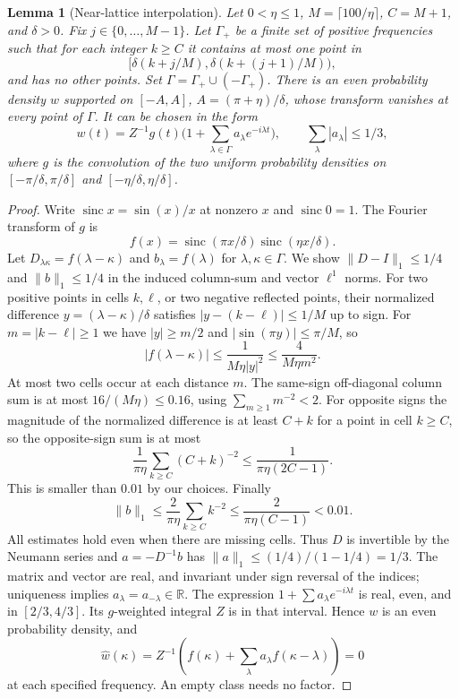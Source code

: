 \documentclass[11pt]{article}
\newtheorem{lemma}[theorem]{Lemma}
\theoremstyle{definition}\newtheorem{definition}[theorem]{Definition}
\newcommand{\R}{\mathbb R}\newcommand{\C}{\mathbb C}\newcommand{\F}{\mathcal F}\newcommand{\sinc}{\operatorname{sinc}}\newcommand{\arcosh}{\operatorname{arcosh}}\newcommand{\sech}{\operatorname{sech}}\newcommand{\ord}{\operatorname{ord}}\newcommand{\supp}{\operatorname{supp}}\newcommand{\dd}{\,\mathrm d}\newcommand{\vnorm}[1]{\lVert #1\rVert}
\begin{document}
\begin{lemma}[Near-lattice interpolation]\label{lem:phase}
Let $0<\eta\le1$, $M=\lceil100/\eta\rceil$, $C=M+1$, and $\delta>0$. Fix $j\in\{0,\dots,M-1\}$. Let $\Gamma_+$ be a finite set of positive frequencies such that for each integer $k\ge C$ it contains at most one point in
\begin{equation}\label{eq:bin}
 [\delta(k+j/M),\delta(k+(j+1)/M)),
\end{equation}
and has no other points. Set $\Gamma=\Gamma_+\cup(-\Gamma_+)$. There is an even probability density $w$ supported on $[-A,A]$, $A=(\pi+\eta)/\delta$, whose transform vanishes at every point of $\Gamma$. It can be chosen in the form
\[
 w(t)=Z^{-1}g(t)\Big(1+\sum_{\lambda\in\Gamma}a_\lambda e^{-i\lambda t}\Big),\qquad \sum_{\lambda}|a_\lambda|\le1/3,
\]
where $g$ is the convolution of the two uniform probability densities on $[-\pi/\delta,\pi/\delta]$ and $[-\eta/\delta,\eta/\delta]$.
\end{lemma}
\begin{proof}
Write $\sinc x=\sin(x)/x$ at nonzero $x$ and $\sinc0=1$. The Fourier transform of $g$ is
\[
 f(x)=\sinc(\pi x/\delta)\sinc(\eta x/\delta).
\]
Let $D_{\lambda\kappa}=f(\lambda-\kappa)$ and $b_\lambda=f(\lambda)$ for $\lambda,\kappa\in\Gamma$. We show $\vnorm{D-I}_1\le1/4$ and $\vnorm b_1\le1/4$ in the induced column-sum and vector $\ell^1$ norms. For two positive points in cells $k,\ell$, or two negative reflected points, their normalized difference $y=(\lambda-\kappa)/\delta$ satisfies $|y-(k-\ell)|\le1/M$ up to sign. For $m=|k-\ell|\ge1$ we have $|y|\ge m/2$ and $|\sin(\pi y)|\le\pi/M$, so
\[
 |f(\lambda-\kappa)|\le\frac{1}{M\eta |y|^2}\le\frac{4}{M\eta m^2}.
\]
At most two cells occur at each distance $m$. The same-sign off-diagonal column sum is at most $16/(M\eta)\le0.16$, using $\sum_{m\ge1}m^{-2}<2$. For opposite signs the magnitude of the normalized difference is at least $C+k$ for a point in cell $k\ge C$, so the opposite-sign sum is at most
\[
 \frac{1}{\pi\eta}\sum_{k\ge C}(C+k)^{-2}\le\frac{1}{\pi\eta(2C-1)}.
\]
This is smaller than $0.01$ by our choices. Finally
\[
 \vnorm b_1\le\frac{2}{\pi\eta}\sum_{k\ge C}k^{-2}\le\frac{2}{\pi\eta(C-1)}<0.01.
\]
All estimates hold even when there are missing cells. Thus $D$ is invertible by the Neumann series and $a=-D^{-1}b$ has $\vnorm a_1\le(1/4)/(1-1/4)=1/3$. The matrix and vector are real, and invariant under sign reversal of the indices; uniqueness implies $a_\lambda=a_{-\lambda}\in\R$. The expression $1+\sum a_\lambda e^{-i\lambda t}$ is real, even, and in $[2/3,4/3]$. Its $g$-weighted integral $Z$ is in that interval. Hence $w$ is an even probability density, and
\[
 \widehat w(\kappa)=Z^{-1}\left(f(\kappa)+\sum_{\lambda}a_\lambda f(\kappa-\lambda)\right)=0
\]
at each specified frequency. An empty class needs no factor.
\end{proof}
\end{document}
